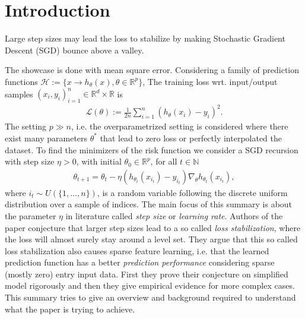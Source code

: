 




\maketitle

\tableofcontents

\section{Introduction}
Large step sizes may lead the loss to stabilize by making Stochastic Gradient
Descent (SGD) bounce above a valley.

The showcase is done with mean square error. Considering a family of
prediction functions $\mathcal{H} := \{x \to h_\theta(x), \theta \in
\mathbb{R}^{p}\}$, The training loss wrt. input/output samples $(x_i,
y_i)_{i=1}^{n} \in \mathbb{R}^{d}\times\mathbb{R}$ is
\begin{align}
    \mathcal{L}(\theta) := \frac{1}{2n} \sum_{i=1}^{n} \left( h_\theta(x_i) -
    y_i \right)^{2}.
\end{align}
The setting $p \gg n$, i.e. the overparametrized setting is considered where
there exist many parameters $\theta^{*}$ that lead to zero loss or perfectly
interpolated the dataset. To find the minimizers of the risk function we
consider a SGD recursion with step size $\eta > 0$, with initial $\theta_0
\in \mathbb{R}^{p}$, for all $t \in \mathbb{N}$
\begin{align}
    \theta_{t+1} = \theta_t - \eta\left(h_{\theta_t}(x_{i_t})
    - y_{i_t}\right)
    \nabla_{\theta} h_{\theta_t}(x_{i_t}), \label{eq: sgd_it}
\end{align}
where $i_t \sim U(\{1,\ldots,n\})$, is a random variable following the
discrete uniform distribution over a sample of indices. The main focus of
this summary is about the parameter $\eta$ in literature called \textit{step
size} or \textit{learning rate}. Authors of the paper
\cite{andriushchenko2023sgd} conjecture that larger step sizes lead to a so
called \textit{loss stabilization}, where the loss will almost surely stay
around a level set. They argue that this so called loss stabilization also
causes sparse feature learning, i.e. that the learned prediction function has
a better \textit{prediction performance} considering sparse (mostly zero)
entry input data. First they prove their conjecture on simplified model
rigorously and then they give empirical evidence for more complex cases.
This summary tries to give an overview and background required to understand
what the paper is trying to achieve.
